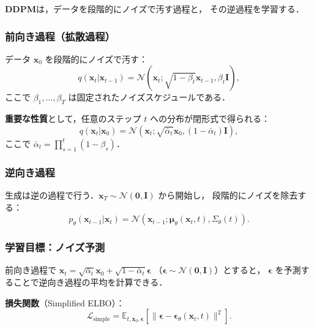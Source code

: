 \textbf{DDPM}\cite{Ho2020}は，データを段階的にノイズで汚す過程と，
その逆過程を学習する．

\subsubsection{前向き過程（拡散過程）}

データ $\boldsymbol{x}_0$ を段階的にノイズで汚す：
\begin{equation}
  q(\boldsymbol{x}_t | \boldsymbol{x}_{t-1}) = \mathcal{N}(\boldsymbol{x}_t; \sqrt{1-\beta_t}\boldsymbol{x}_{t-1}, \beta_t \mathbf{I}),
  \label{eq:forward-process}
\end{equation}
ここで $\beta_1, \ldots, \beta_T$ は固定されたノイズスケジュールである．

\textbf{重要な性質}として，任意のステップ $t$ への分布が閉形式で得られる：
\begin{equation}
  q(\boldsymbol{x}_t | \boldsymbol{x}_0) = \mathcal{N}(\boldsymbol{x}_t; \sqrt{\bar{\alpha}_t}\boldsymbol{x}_0, (1-\bar{\alpha}_t)\mathbf{I}),
  \label{eq:forward-closed}
\end{equation}
ここで $\bar{\alpha}_t = \prod_{s=1}^t (1-\beta_s)$．

\subsubsection{逆向き過程}

生成は逆の過程で行う．$\boldsymbol{x}_T \sim \mathcal{N}(\mathbf{0}, \mathbf{I})$ から開始し，
段階的にノイズを除去する：
\begin{equation}
  p_\theta(\boldsymbol{x}_{t-1}|\boldsymbol{x}_t) = \mathcal{N}(\boldsymbol{x}_{t-1}; \boldsymbol{\mu}_\theta(\boldsymbol{x}_t, t), \Sigma_\theta(t)).
  \label{eq:reverse-process}
\end{equation}

\subsubsection{学習目標：ノイズ予測}

前向き過程で $\boldsymbol{x}_t = \sqrt{\bar{\alpha}_t}\boldsymbol{x}_0 + \sqrt{1-\bar{\alpha}_t}\boldsymbol{\epsilon}$
（$\boldsymbol{\epsilon} \sim \mathcal{N}(\mathbf{0}, \mathbf{I})$）とすると，
$\boldsymbol{\epsilon}$ を予測することで逆向き過程の平均を計算できる．

\textbf{損失関数}（Simplified ELBO）：
\begin{equation}
  \mathcal{L}_{\mathrm{simple}} = \mathbb{E}_{t, \boldsymbol{x}_0, \boldsymbol{\epsilon}}\left[\|\boldsymbol{\epsilon} - \boldsymbol{\epsilon}_\theta(\boldsymbol{x}_t, t)\|^2\right].
  \label{eq:ddpm-loss}
\end{equation}

